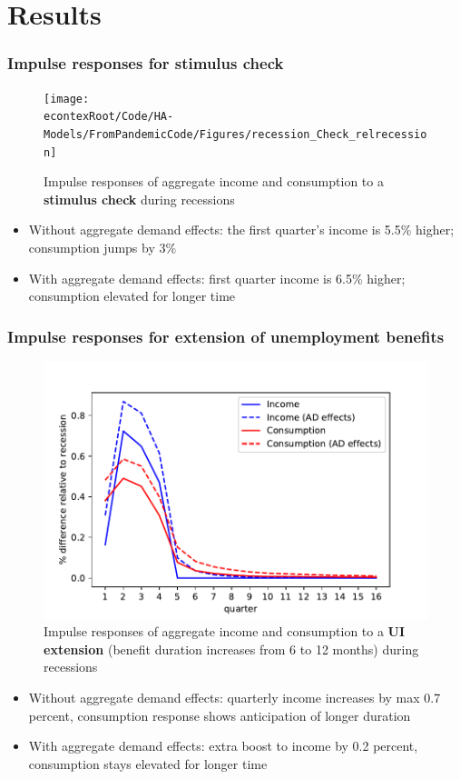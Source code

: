 \documentclass[pdflatex]{beamer}
\begin{document}
\section{Results}


\begin{frame}
\frametitle{Impulse responses for stimulus check}

	\begin{figure}
		\centering
		\texttt{[image: \\econtexRoot/Code/HA-Models/FromPandemicCode/Figures/recession\_Check\_relrecession]}
		\caption{Impulse responses of aggregate income and consumption to a \textbf{stimulus check} during recessions}
	\end{figure}


	\begin{itemize}
		\item Without aggregate demand effects: the first quarter's income is 5.5\% higher; consumption jumps by 3\% 
		\item With aggregate demand effects: first quarter income is 6.5\% higher; consumption elevated for longer time
	\end{itemize}

\end{frame}


\begin{frame}
\frametitle{Impulse responses for extension of unemployment benefits}

	\begin{figure}
		\centering
		\includegraphics[width=0.6\linewidth]{Code/HA-Models/FromPandemicCode/Figures/recession_UI_relrecession}
		\caption{Impulse responses of aggregate income and consumption to a \textbf{UI extension} (benefit duration increases from 6 to 12 months) during recessions}
	\end{figure}
	
	\begin{itemize}
		\item Without aggregate demand effects: quarterly income increases by max 0.7 percent, consumption response shows anticipation of longer duration
		\item With aggregate demand effects: extra boost to income by 0.2 percent, consumption stays elevated for longer time
	\end{itemize}

\end{frame}
\end{document}
